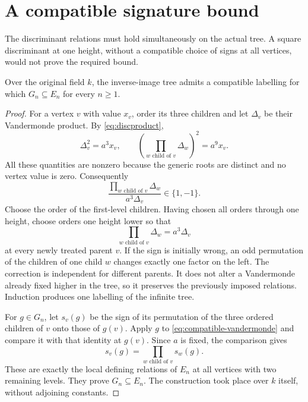 \section{A compatible signature bound}\label{sec:signature}

The discriminant relations must hold simultaneously on the actual
tree. A square discriminant at one height, without a compatible
choice of signs at all vertices, would not prove the required bound.

\begin{proposition}\label{prop:upper}
Over the original field $k$, the inverse-image tree admits a
compatible labelling for which $G_n\subseteq E_n$ for every
$n\geq1$.
\end{proposition}

\begin{proof}
For a vertex $v$ with value $x_v$, order its three children and let
$\Delta_v$ be their Vandermonde product. By
\eqref{eq:discproduct},
\[
 \Delta_v^2=a^3x_v,\qquad
 \left(\prod_{w\text{ child of }v}\Delta_w\right)^2=a^9x_v.
\]
All these quantities are nonzero because the generic roots are
distinct and no vertex value is zero. Consequently
\[
 \frac{\prod_{w\text{ child of }v}\Delta_w}{a^3\Delta_v}
 \in\{1,-1\}.
\]
Choose the order of the first-level children. Having chosen all
orders through one height, choose orders one height lower so that
\begin{equation}\label{eq:compatible-vandermonde}
 \prod_{w\text{ child of }v}\Delta_w=a^3\Delta_v
\end{equation}
at every newly treated parent $v$. If the sign is initially wrong,
an odd permutation of the children of one child $w$ changes exactly
one factor on the left. The correction is independent for different
parents. It does not alter a Vandermonde already fixed higher in
the tree, so it preserves the previously imposed relations.
Induction produces one labelling of the infinite tree.

For $g\in G_n$, let $s_v(g)$ be the sign of its permutation of the
three ordered children of $v$ onto those of $g(v)$. Apply $g$ to
\eqref{eq:compatible-vandermonde} and compare it with that identity
at $g(v)$. Since $a$ is fixed, the comparison gives
\[
 s_v(g)=\prod_{w\text{ child of }v}s_w(g).
\]
These are exactly the local defining relations of $E_n$ at all
vertices with two remaining levels. They prove $G_n\subseteq E_n$.
The construction took place over $k$ itself, without adjoining
constants.
\end{proof}


